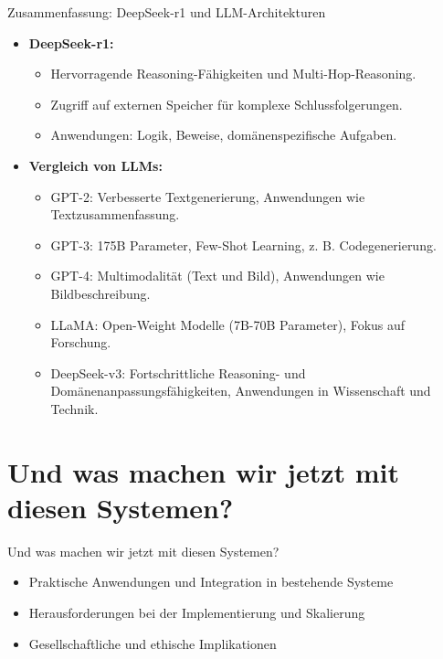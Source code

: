 \documentclass[aspectratio=1610, xcolor=dvipsnames, 9pt]{beamer}
\begin{document}
\begin{frame}{Zusammenfassung: DeepSeek-r1 und LLM-Architekturen}
  \begin{itemize}
    \item \textbf{DeepSeek-r1:}
      \begin{itemize}
        \item Hervorragende Reasoning-Fähigkeiten und Multi-Hop-Reasoning.
        \item Zugriff auf externen Speicher für komplexe Schlussfolgerungen.
        \item Anwendungen: Logik, Beweise, domänenspezifische Aufgaben.
      \end{itemize}
    \item \textbf{Vergleich von LLMs:}
      \begin{itemize}
        \item GPT-2: Verbesserte Textgenerierung, Anwendungen wie Textzusammenfassung.
        \item GPT-3: 175B Parameter, Few-Shot Learning, z. B. Codegenerierung.
        \item GPT-4: Multimodalität (Text und Bild), Anwendungen wie Bildbeschreibung.
        \item LLaMA: Open-Weight Modelle (7B-70B Parameter), Fokus auf Forschung.
        \item DeepSeek-v3: Fortschrittliche Reasoning- und Domänenanpassungsfähigkeiten, Anwendungen in Wissenschaft und Technik.
      \end{itemize}
  \end{itemize}
\end{frame}


\section{Und was machen wir jetzt mit diesen Systemen?}

\begin{frame}{Und was machen wir jetzt mit diesen Systemen?}
  \begin{itemize}
    \item Praktische Anwendungen und Integration in bestehende Systeme \\
    \item Herausforderungen bei der Implementierung und Skalierung \\
    \item Gesellschaftliche und ethische Implikationen
  \end{itemize}
\end{frame}
\end{document}
